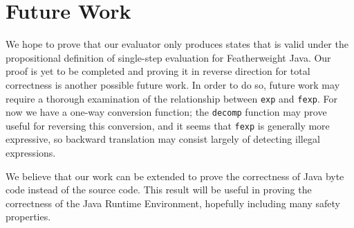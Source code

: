 \documentclass{article}
\begin{document}
\section{Future Work}

We hope to prove that our evaluator only produces states that is valid under the propositional definition of single-step evaluation for Featherweight Java. Our proof is yet to be completed and proving it in reverse direction for total correctness is another possible future work. In order to do so, future work may require a thorough examination of the relationship between \texttt{exp} and \texttt{fexp}. For now we have a one-way conversion function; the \texttt{decomp} function may prove useful for reversing this conversion, and it seems that \texttt{fexp} is generally more expressive, so backward translation may consist largely of detecting illegal expressions.

We believe that our work can be extended to prove the correctness of Java byte code instead of the source code. This result will be useful in proving the correctness of the Java Runtime Environment, hopefully including many safety properties.

{}

\end{document}
